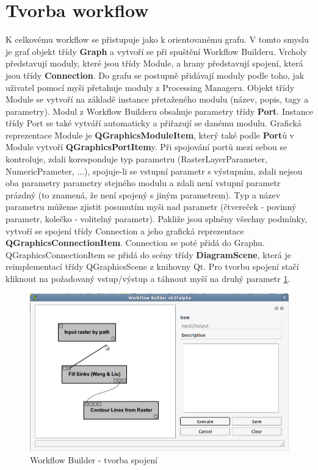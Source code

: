 \newpage
\section{Tvorba workflow}
K celkovému workflow se přistupuje jako k orientovanému grafu. V tomto
smyslu je graf objekt třídy \textbf{Graph} a vytvoří se při spuštění
Workflow Builderu. Vrcholy představují moduly, které jsou třídy
Module, a hrany představují spojení, která jsou
třídy \textbf{Connection}. Do grafu se postupně přidávají moduly podle
toho, jak uživatel pomocí myši přetahuje moduly z Processing
Manageru. Objekt třídy Module se vytvoří na základě instance
přetaženého modulu (název, popis, tagy a parametry). Modul z Workflow
Builderu obsahuje parametry třídy \textbf{Port}. Instance třídy Port
se také vytváří automaticky a přiřazují se danému modulu. Grafická
reprezentace Module je \textbf{QGraphicsModuleItem}, který také
podle \textbf{Port}ů v Module vytvoří \textbf{QGraphicsPortItem}y. Při
spojování portů mezi sebou se kontroluje, zdali koresponduje typ
parametru (RasterLayerParameter, NumericPrameter, ...), spojuje-li se
vstupní parametr s výstupním, zdali nejsou oba parametry parametry
stejného modulu a zdali není vstupní parametr prázdný (to znamená, že
není spojený s jiným parametrem). Typ a název parametru můžeme zjistit
posunutím myši nad parametr (čtvereček - povinný parametr, kolečko -
volitelný parametr). Pakliže jsou splněny všechny podmínky, vytvoří se
spojení třídy Connection a jeho grafická
reprezentace \textbf{QGraphicsConnectionItem}. Connection se poté
přidá do Graphu. QGraphicsConnectionItem se přidá do scény
třídy \textbf{DiagramScene}, která je reimplementací třídy
QGraphicsScene z knihovny Qt. Pro tvorbu spojení stačí kliknout na
požadovaný vstup/výstup a táhnout myší na druhý
parametr \figurename \ref{wf:crCon}.

\begin{figure}[h]
	\centering
	\includegraphics[scale=0.5]{pictures/wf/wf_crCon}
	\caption{Workflow Builder - tvorba spojení}
  	\label{wf:crCon}
\end{figure}

